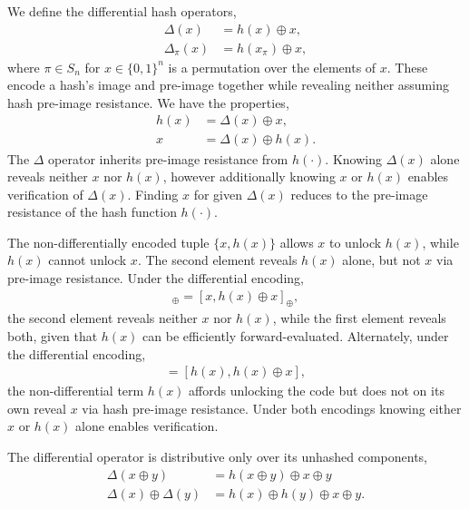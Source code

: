 \documentclass[twocolumn, aps, amsmath, amssymb, nofootinbib, superscriptaddress, longbibliography, doublefloatfix, table-of-contents, eqsecnum, rmp]{revtex4-2}
\begin{document}
We define the differential hash operators,
\begin{align}
	\Delta(x) &= h(x)\oplus x,\nonumber\\
	\Delta_\pi(x) &= h(x_\pi)\oplus x,
\end{align}
where $\pi\in S_n$ for $x\in\{0,1\}^n$ is a permutation over the elements of $x$. These encode a hash's image and pre-image together while revealing neither assuming hash pre-image resistance. We have the properties,
\begin{align}
	h(x) &= \Delta(x) \oplus x,\nonumber\\
	x &= \Delta(x) \oplus h(x).
\end{align}
The $\Delta$ operator inherits pre-image resistance from $h(\cdot)$. Knowing $\Delta(x)$ alone reveals neither $x$ nor $h(x)$, however additionally knowing $x$ or $h(x)$ enables verification of $\Delta(x)$. Finding $x$ for given $\Delta(x)$ reduces to the pre-image resistance of the hash function $h(\cdot)$.

The non-differentially encoded tuple $\{x,h(x)\}$ allows $x$ to unlock $h(x)$, while $h(x)$ cannot unlock $x$. The second element reveals $h(x)$ alone, but not $x$ via pre-image resistance. Under the differential encoding,
\begin{align}
	[x,\Delta(x)]_\oplus =[x,h(x)\oplus x]_\oplus,
\end{align}
the second element reveals neither $x$ nor $h(x)$, while the first element reveals both, given that $h(x)$ can be efficiently forward-evaluated. Alternately, under the differential encoding,
\begin{align}
	[h(x),\Delta(x)] = [h(x),h(x)\oplus x],
\end{align}
the non-differential term $h(x)$ affords unlocking the code but does not on its own reveal $x$ via hash pre-image resistance. Under both encodings knowing either $x$ or $h(x)$ alone enables verification.

The differential operator is distributive only over its unhashed components,
\begin{align}
	\Delta(x\oplus y) &= h(x\oplus y)\oplus x\oplus y \nonumber\\
	\Delta(x)\oplus\Delta(y) &= h(x)\oplus h(y)\oplus x\oplus y.
\end{align}

\end{document}
